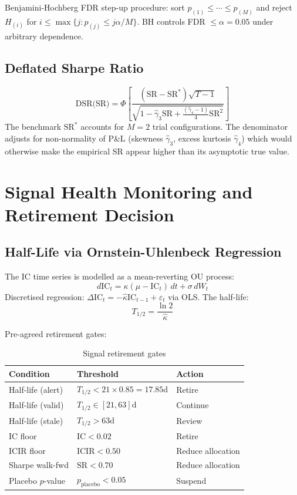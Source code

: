 \documentclass[11pt]{article}
\begin{document}
Benjamini-Hochberg FDR step-up procedure: sort $p_{(1)} \leq \cdots \leq p_{(M)}$ and reject $H_{(i)}$ for $i \leq \max\{j : p_{(j)} \leq j\alpha/M\}$. BH controls FDR $\leq \alpha = 0.05$ under arbitrary dependence.

\subsection{Deflated Sharpe Ratio}

\begin{equation}
\text{DSR(SR)} = \Phi\left[\frac{(\text{SR} - \text{SR}^*)\sqrt{T-1}}{\sqrt{1 - \hat{\gamma}_3 \text{SR} + \frac{(\hat{\gamma}_4-1)}{4}\text{SR}^2}}\right]
\label{eq:dsr}
\end{equation}
The benchmark $\text{SR}^*$ accounts for $M=2$ trial configurations. The denominator adjusts for non-normality of P\&L (skewness $\hat{\gamma}_3$, excess kurtosis $\hat{\gamma}_4$) which would otherwise make the empirical SR appear higher than its asymptotic true value.

\section{Signal Health Monitoring and Retirement Decision}

\subsection{Half-Life via Ornstein-Uhlenbeck Regression}

The IC time series is modelled as a mean-reverting OU process:
\begin{equation}
d\text{IC}_t = \kappa(\mu - \text{IC}_t)\,dt + \sigma\, dW_t
\label{eq:ou-process}
\end{equation}
Discretised regression: $\Delta \text{IC}_t = -\hat{\kappa} \text{IC}_{t-1} + \varepsilon_t$ via OLS. The half-life:
\begin{equation}
T_{1/2} = \frac{\ln 2}{\hat{\kappa}}
\label{eq:half-life}
\end{equation}

Pre-agreed retirement gates:

\begin{table}[h]
\centering
\caption{Signal retirement gates}
\begin{tabular}{lll}
\toprule
Condition & Threshold & Action \\
\midrule
Half-life (alert) & $T_{1/2} < 21 \times 0.85 = 17.85$d & Retire \\
Half-life (valid)  & $T_{1/2} \in [21, 63]$d & Continue \\
Half-life (stale)  & $T_{1/2} > 63$d & Review \\
IC floor           & $\text{IC} < 0.02$ & Retire \\
ICIR floor         & $\text{ICIR} < 0.50$ & Reduce allocation \\
Sharpe walk-fwd    & $\text{SR} < 0.70$ & Reduce allocation \\
Placebo $p$-value  & $p_{\text{placebo}} < 0.05$ & Suspend \\
\bottomrule
\end{tabular}
\end{table}
\end{document}
